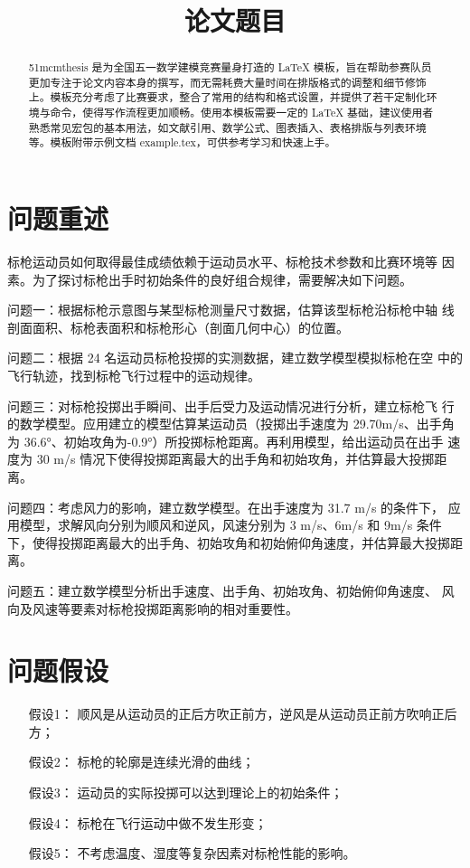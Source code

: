 \documentclass{51mcmthesis}
\title{论文题目}
\begin{document}
\maketitle
{}
\begin{abstract}
    51mcmthesis 是为全国五一数学建模竞赛量身打造的 \LaTeX{} 模板，旨在帮助参赛队员更加专注于论文内容本身的撰写，而无需耗费大量时间在排版格式的调整和细节修饰上。模板充分考虑了比赛要求，整合了常用的结构和格式设置，并提供了若干定制化环境与命令，使得写作流程更加顺畅。使用本模板需要一定的 \LaTeX{} 基础，建议使用者熟悉常见宏包的基本用法，如文献引用、数学公式、图表插入、表格排版与列表环境等。模板附带示例文档 example.tex，可供参考学习和快速上手。


\end{abstract}
\section{问题重述}
标枪运动员如何取得最佳成绩依赖于运动员水平、标枪技术参数和比赛环境等
因素。为了探讨标枪出手时初始条件的良好组合规律，需要解决如下问题。

问题一：根据标枪示意图与某型标枪测量尺寸数据，估算该型标枪沿标枪中轴
线剖面面积、标枪表面积和标枪形心（剖面几何中心）的位置。

问题二：根据 24 名运动员标枪投掷的实测数据，建立数学模型模拟标枪在空
中的飞行轨迹，找到标枪飞行过程中的运动规律。

问题三：对标枪投掷出手瞬间、出手后受力及运动情况进行分析，建立标枪飞
行的数学模型。应用建立的模型估算某运动员（投掷出手速度为 29.70m/s、出手角
为 36.6°、初始攻角为-0.9°）所投掷标枪距离。再利用模型，给出运动员在出手
速度为 30 m/s 情况下使得投掷距离最大的出手角和初始攻角，并估算最大投掷距
离。

问题四：考虑风力的影响，建立数学模型。在出手速度为 31.7 m/s 的条件下，
应用模型，求解风向分别为顺风和逆风，风速分别为 3 m/s、6m/s 和 9m/s 条件
下，使得投掷距离最大的出手角、初始攻角和初始俯仰角速度，并估算最大投掷距
离。

问题五：建立数学模型分析出手速度、出手角、初始攻角、初始俯仰角速度、
风向及风速等要素对标枪投掷距离影响的相对重要性。
\section{问题假设}
\noindent\begin{enumerate}
    \item[假设1：] 顺风是从运动员的正后方吹正前方，逆风是从运动员正前方吹响正后方；
    \item[假设2：] 标枪的轮廓是连续光滑的曲线；
    \item[假设3：] 运动员的实际投掷可以达到理论上的初始条件；
    \item[假设4：] 标枪在飞行运动中做不发生形变；
    \item[假设5：] 不考虑温度、湿度等复杂因素对标枪性能的影响。
\end{enumerate}
\end{document}
